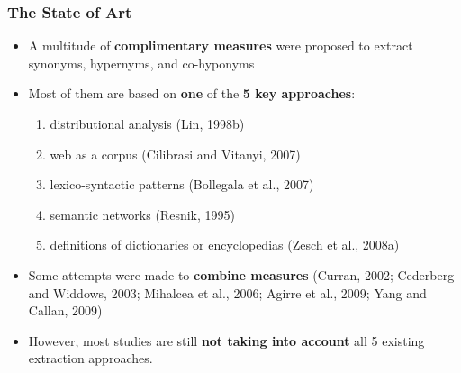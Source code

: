 \documentclass{beamer}
\begin{document}
\begin{frame}
\frametitle{The State of Art}
\begin{itemize}
\item A multitude of \textbf{complimentary measures} were proposed to extract synonyms, hypernyms,
and co-hyponyms

\item Most of them are based on \textbf{one} of the \textbf{5 key approaches}: 
\begin{enumerate}
\item distributional analysis (Lin, 1998b)
\item web as a corpus (Cilibrasi and Vitanyi, 2007)
\item lexico-syntactic patterns (Bollegala et al., 2007)
\item semantic networks (Resnik, 1995)
\item definitions of dictionaries or encyclopedias (Zesch et al., 2008a)
\end{enumerate}

\pause


\item Some attempts were made to \textbf{combine measures} (Curran, 2002; Cederberg and Widdows, 2003; Mihalcea et al., 2006;
Agirre et al., 2009; Yang and Callan, 2009)


\item However, most studies are still \textbf{not taking into account}
all 5 existing extraction approaches.

\end{itemize}

\end{frame}
\end{document}
